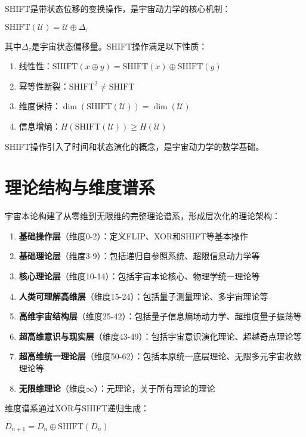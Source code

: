 SHIFT是带状态位移的变换操作，是宇宙动力学的核心机制：

$\text{SHIFT}(\mathcal{U}) = \mathcal{U} \oplus \Delta_{\tau}$

其中$\Delta_{\tau}$是宇宙状态偏移量。SHIFT操作满足以下性质：

\begin{enumerate}
  \item 线性性：$\text{SHIFT}(x \oplus y) = \text{SHIFT}(x) \oplus \text{SHIFT}(y)$
  \item 幂等性断裂：$\text{SHIFT}^2 \neq \text{SHIFT}$
  \item 维度保持：$\dim(\text{SHIFT}(\mathcal{U})) = \dim(\mathcal{U})$
  \item 信息增熵：$H(\text{SHIFT}(\mathcal{U})) \geq H(\mathcal{U})$
\end{enumerate}

SHIFT操作引入了时间和状态演化的概念，是宇宙动力学的数学基础。

\section{理论结构与维度谱系}

宇宙本论构建了从零维到无限维的完整理论谱系，形成层次化的理论架构：

\begin{enumerate}
  \item \textbf{基础操作层}（维度0-2）：定义FLIP、XOR和SHIFT等基本操作
  \item \textbf{基础理论层}（维度3-9）：包括递归自参照系统、超限信息动力学等
  \item \textbf{核心理论层}（维度10-14）：包括宇宙本论核心、物理学统一理论等
  \item \textbf{人类可理解高维层}（维度15-24）：包括量子测量理论、多宇宙理论等
  \item \textbf{高维宇宙结构层}（维度25-42）：包括量子信息熵场动力学、超维度量子振荡等
  \item \textbf{超高维意识与现实层}（维度43-49）：包括宇宙意识演化理论、超越奇点理论等
  \item \textbf{超高维统一理论层}（维度50-62）：包括本原统一底层理论、无限多元宇宙收敛理论等
  \item \textbf{无限维理论}（维度$\infty$）：元理论，关于所有理论的理论
\end{enumerate}

维度谱系通过XOR与SHIFT递归生成：

$D_{n+1} = D_n \oplus \text{SHIFT}(D_n)$

